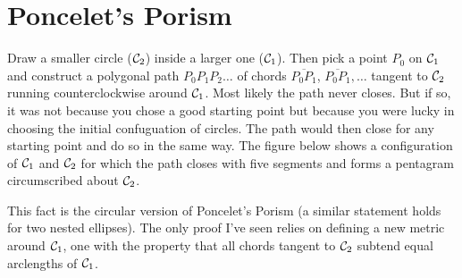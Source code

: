 \documentclass{ximera}
\begin{document}

\section*{Poncelet's Porism}




Draw a smaller circle (${\cal C}_2$) inside a larger one (${\cal C}_1$). Then pick a point $P_0$ on ${\cal C}_1$ and construct a polygonal path $P_0 P_1 P_2 \ldots$ of chords $\overline{P_0P_1}$, $\overline{P_0P_1}, \ldots$ tangent to ${\cal C}_2$ running counterclockwise around ${\cal C}_1$. Most likely the path never closes.  But if so, it was not because you chose a good starting point but because you were lucky in choosing the initial confuguation of circles. The path would then close for any starting point and do so in the same way. The figure below shows a configuration of ${\cal C}_1$ and ${\cal C}_2$ for which the path closes with five segments and forms a pentagram circumscribed about ${\cal C}_2$.


This fact is the circular version of Poncelet's Porism (a similar statement holds for two nested ellipses). The only proof I've seen relies on defining a new metric around ${\cal C}_1$, one with the property that all chords tangent to ${\cal C}_2$ subtend equal arclengths of ${\cal C}_1$. 
\end{document}
